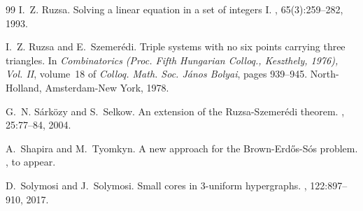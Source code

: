\documentclass[11pt]{article}
\numberwithin{equation}{section}
\theoremstyle{plain}
\theoremstyle{remark}
\begin{document}
\begin{thebibliography}{99}
I.~Z. Ruzsa.
\newblock Solving a linear equation in a set of integers {I}.
, 65(3):259--282, 1993.

I.~Z. Ruzsa and E.~Szemer\'{e}di.
\newblock Triple systems with no six points carrying three triangles.
\newblock In {\em Combinatorics ({P}roc. {F}ifth {H}ungarian {C}olloq.,
  {K}eszthely, 1976), {V}ol. {II}}, volume~18 of {\em Colloq. Math. Soc.
  J\'{a}nos Bolyai}, pages 939--945. North-Holland, Amsterdam-New York, 1978.

G.~N. S{\'a}rk{\"o}zy and S.~Selkow.
\newblock An extension of the {R}uzsa-{S}zemer{\'e}di theorem.
, 25:77--84, 2004.

A.~Shapira and M.~Tyomkyn.
\newblock A new approach for the {B}rown-{E}rd{\H{o}}s-{S}\'{o}s problem.
, to appear.

D.~Solymosi and J.~Solymosi.
\newblock Small cores in 3-uniform hypergraphs.
, 122:897--910, 2017.

\end{thebibliography}
\end{document}
